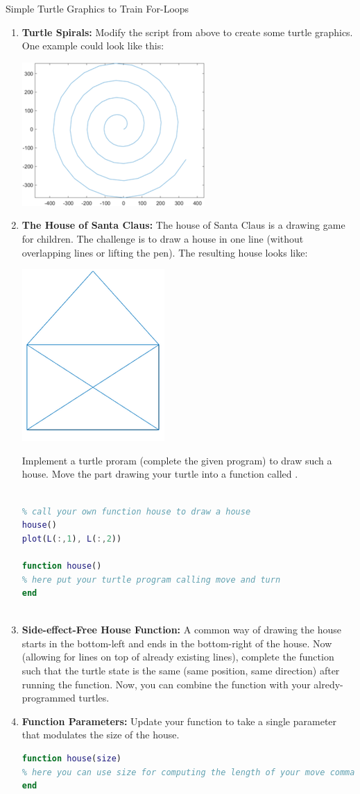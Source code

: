 \begin{task}{Simple Turtle Graphics to Train For-Loops}{}{}
  \begin{enumerate}
  \item{\textbf{Turtle Spirals:} Modify the script from above to create some turtle graphics. One example could look like this:
    
    \includegraphics[width=.25\textwidth]{gfx/2021_02_turtle_examplespiral.png}
  }

    \item{\textbf{The House of Santa Claus:} The house of Santa Claus is a drawing game for children. The challenge is to draw a house in one line (without overlapping lines or lifting the pen). The resulting house looks like:

      \includegraphics[width=.25\textwidth]{gfx/2021_02_turtle_houseofsanta.png}

      Implement a turtle proram (complete the given program) to draw such a house. Move the part drawing your turtle into a function called .
      \begin{lstlisting}[language=matlab]

% call your own function house to draw a house
house()
plot(L(:,1), L(:,2))

function house()
% here put your turtle program calling move and turn
end
        
       \end{lstlisting}
      
    }
    \item{\textbf{Side-effect-Free House Function:}
      A common way of drawing the house starts in the bottom-left and ends in the bottom-right of the house. Now (allowing for lines on top of already existing lines), complete the function such that the turtle state is the same (same position, same direction) after running the function. Now, you can combine the  function with your alredy-programmed turtles.
    }
    \item{\textbf{Function Parameters\up{*}:} Update your function to take a single parameter  that modulates the size of the house.
\begin{lstlisting}[language=matlab]
function house(size)
% here you can use size for computing the length of your move commands
end
\end{lstlisting}
    }


\end{enumerate}
\end{task}
